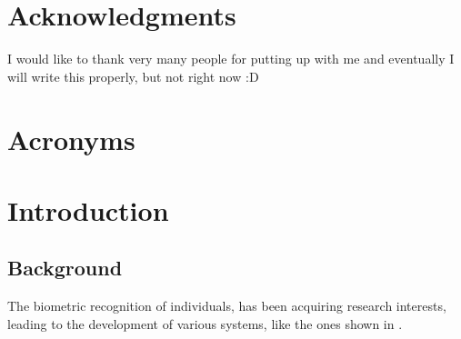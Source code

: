 \documentclass[titlepage,12pt,a4paper,times]{book}
\begin{document}


\clearpage{\thispagestyle{empty}\cleardoublepage}

\frontmatter
\chapter*{Acknowledgments}
\label{chap:ack}

I would like to thank very many people for putting up with me and eventually I
will write this properly, but not right now :D

\tableofcontents

\clearpage{\thispagestyle{empty}\cleardoublepage}

\listoffigures

\clearpage{\thispagestyle{empty}\cleardoublepage}

\listoftables
\clearpage{\thispagestyle{empty}\cleardoublepage}


\chapter*{Acronyms}
\begin{acronym}[SIFT]
\end{acronym}

% 

\clearpage{\thispagestyle{empty}\cleardoublepage}

\mainmatter
\chapter{Introduction}
\label{chap:intro}
\nocite{*}
\section{Background}
\label{sec:amb}

The biometric recognition of individuals, has been acquiring research
interests, leading to the development of various systems, like the ones shown in
\citep{14, 15}.
\end{document}
